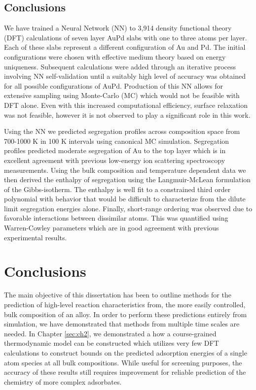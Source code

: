 \documentclass[12pt]{cmuthesis}
\begin{document}
\section{Conclusions}
\label{sec:orgbbea0e7}
We have trained a Neural Network (NN) to 3,914 density functional theory (DFT) calculations of seven layer AuPd slabs with one to three atoms per layer. Each of these slabs represent a different configuration of Au and Pd. The initial configurations were chosen with effective medium theory based on energy uniqueness. Subsequent calculations were added through an iterative process involving NN self-validation until a suitably high level of accuracy was obtained for all possible configurations of AuPd. Production of this NN allows for extensive sampling using Monte-Carlo (MC) which would not be feasible with DFT alone. Even with this increased computational efficiency, surface relaxation was not feasible, however it is not observed to play a significant role in this work.

Using the NN we predicted segregation profiles across composition space from 700-1000 K in 100 K intervals using canonical MC simulation. Segregation profiles predicted moderate segregation of Au to the top layer which is in excellent agreement with previous low-energy ion scattering spectroscopy measurements. Using the bulk composition and temperature dependent data we then derived the enthalpy of segregation using the Langmuir-McLean formulation of the Gibbs-isotherm. The enthalpy is well fit to a constrained third order polynomial with behavior that would be difficult to characterize from the dilute limit segregation energies alone. Finally, short-range ordering was observed due to favorable interactions between dissimilar atoms. This was quantified using Warren-Cowley parameters which are in good agreement with previous experimental results.

\chapter{Conclusions}
\label{sec:ch7}
The main objective of this dissertation has been to outline methods for the prediction of high-level reaction characteristics from, the more easily controlled, bulk composition of an alloy. In order to perform these predictions entirely from simulation, we have demonstrated that methods from multiple time scales are needed. In Chapter \ref{sec:ch2}, we demonstrated a how a course-grained thermodynamic model can be constructed which utilizes very few DFT calculations to construct bounds on the predicted adsorption energies of a single atom species at all bulk compositions. While useful for screening purposes, the accuracy of these results still requires improvement for reliable prediction of the chemistry of more complex adsorbates.
\end{document}
